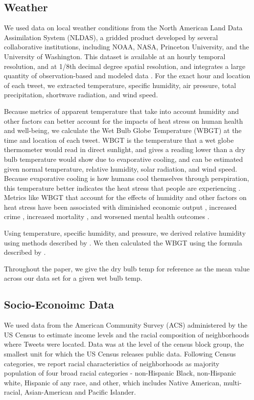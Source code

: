 \documentclass[fleqn,10pt]{wlscirep}
\begin{document}
\subsection*{Weather}
We used data on local weather conditions from the North American Land Data Assimilation System (NLDAS), a gridded product developed by several collaborative institutions, including NOAA, NASA, Princeton University, and the University of Washington.  This dataset is available at an hourly temporal resolution, and at 1/8th decimal degree spatial resolution, and integrates a large quantity of observation-based and modeled data  \cite{xia_continental-scale_2012}.  For the exact hour and location of each tweet, we extracted temperature, specific humidity, air pressure, total precipitation, shortwave radiation, and wind speed.  

Because metrics of apparent temperature that take into account humidity and other factors can better account for the impacts of heat stress on human health and well-being, we calculate the Wet Bulb Globe Temperature (WBGT) at the time and location of each tweet.  WBGT is the temperature that a wet globe thermometer would read in direct sunlight, and gives a reading lower than a dry bulb temperature would show due to evaporative cooling, and can be estimated given normal temperature, relative humidity, solar radiation, and wind speed.  Because evaporative cooling is how humans cool themselves through perspiration, this temperature better indicates the heat stress that people are experiencing \cite{budd2008wet}.  Metrics like WBGT that account for the effects of humidity and other factors on heat stress have been associated with diminished economic output \cite{rao2020projections}, increased crime \cite{hu2017impact}, increased mortality \cite{chien2016spatiotemporal, armstrong2019role}, and worsened mental health outcomes \cite{vida2012relationship, ding2016importance}.

Using temperature, specific humidity, and pressure, we derived relative humidity using methods described by  \cite{bolton_computation_1980}.  We then calculated the WBGT using the formula described by \cite{heo2019comparison}.

Throughout the paper, we give the dry bulb temp for reference as the mean value across our data set for a given wet bulb temp.

\subsection*{Socio-Econoimc Data}
We used data from the American Community Survey (ACS) administered by the US Census to estimate income levels and the racial composition of neighborhoods where Tweets were located.  Data was at the level of the census block group, the smallest unit for which the US Census releases public data. Following Census categories, we report racial characteristics of neighborhoods as majority population of four broad racial categories - non-Hispanic Black, non-Hispanic white, Hispanic of any race, and other, which includes Native American, multi-racial, Asian-American and Pacific Islander. 
\end{document}
